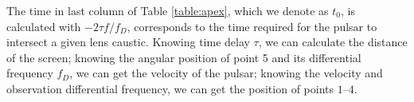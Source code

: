 \documentclass[useAMS,usenatbib]{mn2e}
\begin{document}
The time in last column of Table \ref{table:apex}, which we denote as $t_0$, is calculated with $-2{\tau}f/{f_{D}}$,
corresponds to the time required for the pulsar to intersect a given
lens caustic.
Knowing time delay ${\tau}$, we can calculate the distance of the screen; knowing the angular position of point 5 and its differential frequency ${f_D}$, we can get the velocity of the pulsar; knowing the velocity and observation differential frequency, we can get the position of points $1$--$4$. 

\end{document}
